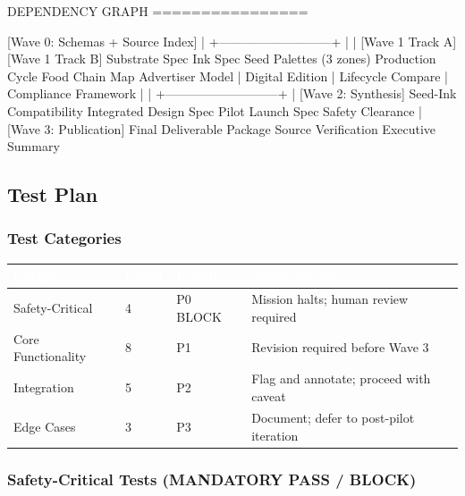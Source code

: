 \documentclass[11pt,letterpaper]{article}
\newcommand{\tableheader}[1]{\textbf{\sffamily\textcolor{white}{#1}}}
\begin{document}
\begin{asciibox}
DEPENDENCY GRAPH
================

  [Wave 0: Schemas + Source Index]
           |
           +---------------------------+
           |                           |
  [Wave 1 Track A]             [Wave 1 Track B]
  Substrate Spec               Ink Spec
  Seed Palettes (3 zones)      Production Cycle
  Food Chain Map               Advertiser Model
           |                   Digital Edition
           |                   Lifecycle Compare
           |                   Compliance Framework
           |                           |
           +---------------------------+
                       |
              [Wave 2: Synthesis]
              Seed-Ink Compatibility
              Integrated Design Spec
              Pilot Launch Spec
              Safety Clearance
                       |
              [Wave 3: Publication]
              Final Deliverable Package
              Source Verification
              Executive Summary
\end{asciibox}

\subsection{Test Plan}

\subsubsection{Test Categories}

\begin{center}
\begin{tabularx}{\textwidth}{L{3cm}C{1.5cm}C{2cm}X}
\toprule
{}
\tableheader{Category} & \tableheader{Count} & \tableheader{Priority} & \tableheader{Action on Fail} \\
\midrule
Safety-Critical & 4 & P0 BLOCK & Mission halts; human review required \\
Core Functionality & 8 & P1 & Revision required before Wave 3 \\
Integration & 5 & P2 & Flag and annotate; proceed with caveat \\
Edge Cases & 3 & P3 & Document; defer to post-pilot iteration \\
\bottomrule
\end{tabularx}
\end{center}

\subsubsection{Safety-Critical Tests (MANDATORY PASS / BLOCK)}
\end{document}
